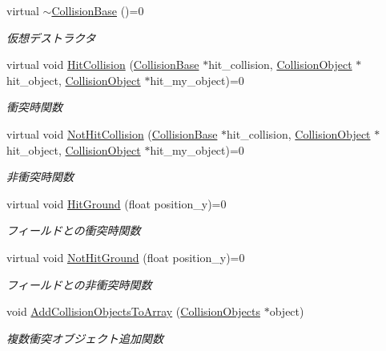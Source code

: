 \begin{DoxyCompactItemize}
virtual \mbox{\hyperlink{class_collision_base_a5ccb28bbf909f23f2df2fd6807b171f5}{$\sim$\+Collision\+Base}} ()=0
\begin{DoxyCompactList}\small\item\em 仮想デストラクタ \end{DoxyCompactList}\item 
virtual void \mbox{\hyperlink{class_collision_base_a5c94fe03f875595758e83eb2a176e45d}{Hit\+Collision}} (\mbox{\hyperlink{class_collision_base}{Collision\+Base}} $\ast$hit\+\_\+collision, \mbox{\hyperlink{class_collision_object}{Collision\+Object}} $\ast$hit\+\_\+object, \mbox{\hyperlink{class_collision_object}{Collision\+Object}} $\ast$hit\+\_\+my\+\_\+object)=0
\begin{DoxyCompactList}\small\item\em 衝突時関数 \end{DoxyCompactList}\item 
virtual void \mbox{\hyperlink{class_collision_base_a9b64fc5c3f2aac2a05296985ef799fb1}{Not\+Hit\+Collision}} (\mbox{\hyperlink{class_collision_base}{Collision\+Base}} $\ast$hit\+\_\+collision, \mbox{\hyperlink{class_collision_object}{Collision\+Object}} $\ast$hit\+\_\+object, \mbox{\hyperlink{class_collision_object}{Collision\+Object}} $\ast$hit\+\_\+my\+\_\+object)=0
\begin{DoxyCompactList}\small\item\em 非衝突時関数 \end{DoxyCompactList}\item 
virtual void \mbox{\hyperlink{class_collision_base_a48c9d1d9e4286cde5054d4d2aa70bdd8}{Hit\+Ground}} (float position\+\_\+y)=0
\begin{DoxyCompactList}\small\item\em フィールドとの衝突時関数 \end{DoxyCompactList}\item 
virtual void \mbox{\hyperlink{class_collision_base_ac1ed5b1c0c9b6b70b432e6656f9c4b45}{Not\+Hit\+Ground}} (float position\+\_\+y)=0
\begin{DoxyCompactList}\small\item\em フィールドとの非衝突時関数 \end{DoxyCompactList}\item 
void \mbox{\hyperlink{class_collision_base_ace98d75317a9f56bc6cada7980285b53}{Add\+Collision\+Objects\+To\+Array}} (\mbox{\hyperlink{class_collision_objects}{Collision\+Objects}} $\ast$object)
\begin{DoxyCompactList}\small\item\em 複数衝突オブジェクト追加関数 \end{DoxyCompactList}\item 

\end{DoxyCompactItemize}
